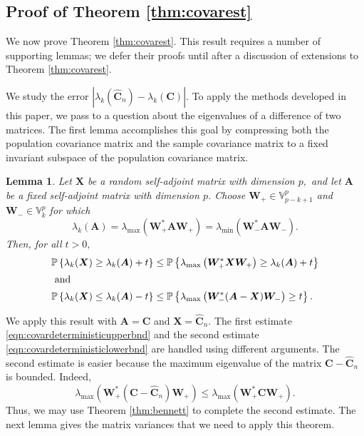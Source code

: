 \documentclass[11pt,letterpaper,twoside,reqno,nosumlimits]{amsart}
\renewcommand{\star}{*}
\newcommand{\mat}[1]{\ensuremath{\bm{#1}}} %
\newcommand{\Prob}[1]{\ensuremath{\mathbb{P}\left\{#1\right\}}}
\newcommand{\lambdamax}[1]{\ensuremath{\lambda_{\mathrm{max}}\left(#1\right)}}
\newcommand{\lambdamin}[1]{\ensuremath{\lambda_{\mathrm{min}}\left(#1\right)}}
\newcommand{\Isom}[2]{\ensuremath{\mathbb{V}_{#1}^{#2}}}
\newtheorem{lemma}[thm]{Lemma}
\theoremstyle{remark}
\numberwithin{equation}{section}
\numberwithin{thm}{section}
\numberwithin{prop}{section}
\numberwithin{defn}{section}
\numberwithin{remark}{section}
\begin{document}
\subsection{Proof of Theorem \ref{thm:covarest}}
We now prove Theorem \ref{thm:covarest}. This result requires a number of supporting lemmas; we defer their proofs until after a discussion of extensions to Theorem \ref{thm:covarest}.

We study the error $|\lambda_k(\widehat{\mat{C}}_n) - \lambda_k(\mat{C})|.$ To apply the methods developed in this paper, we pass to a question about the eigenvalues of a difference of two matrices. The first lemma accomplishes this goal by compressing both the population covariance matrix and the sample covariance matrix to a fixed invariant subspace of the population covariance matrix.

\begin{lemma}
\label{lemma:splittail}
Let $\mat{X}$ be a random self-adjoint matrix with dimension $p,$ and let $\mat{A}$ be a fixed self-adjoint matrix with dimension $p$. Choose $\mat{W}_+ \in \Isom{p-k+1}{p}$ and $\mat{W}_- \in \Isom{k}{p}$ for which
\[
  \lambda_k(\mat{A}) = \lambdamax{\mat{W}_+^*\mat{A}\mat{W}_+} = \lambdamin{\mat{W}_-^*\mat{A}\mat{W}_-}.
\]
Then, for all $t >0,$
\begin{align}
 \Prob{\lambda_k(\mat{X}) \geq \lambda_k(\mat{A}) + t} & \leq \Prob{\lambdamax{\mat{W}_+^\star \mat{X} \mat{W}_+} \geq \lambda_k(\mat{A}) + t } \label{eqn:covardeterministicupperbnd}\\
\intertext{ and }
 \Prob{\lambda_k(\mat{X}) \leq \lambda_k(\mat{A}) -t } &\leq \Prob{\lambdamax{\mat{W}_-^\star(\mat{A} - \mat{X}) \mat{W}_-} \geq t}.
 \label{eqn:covardeterministiclowerbnd}
\end{align}
\end{lemma}

We apply this result with $\mat{A} = \mat{C}$ and $\mat{X} = \widehat{\mat{C}}_n.$ The first estimate \eqref{eqn:covardeterministicupperbnd} and the second estimate \eqref{eqn:covardeterministiclowerbnd} are handled using different arguments. The second estimate is easier because the maximum eigenvalue of the matrix $\mat{C} - \widehat{\mat{C}}_n$ is bounded. Indeed,
\[
 \lambdamax{\mat{W}_+^\star (\mat{C} - \widehat{\mat{C}}_n) \mat{W}_+} \leq \lambdamax{\mat{W}_+^\star \mat{C} \mat{W}_+}.
\]
Thus, we may use Theorem \ref{thm:bennett} to complete the second estimate. The next lemma gives the matrix variances that we need to apply this theorem.
\end{document}
